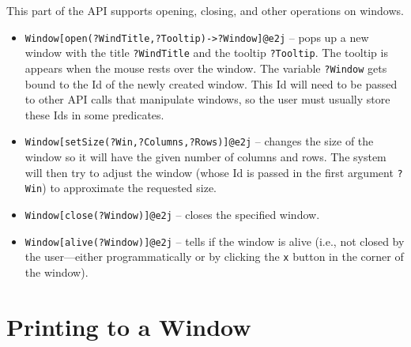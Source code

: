 This part of the API supports opening, closing, and other operations on windows.
\begin{itemize}
\item \texttt{Window[open(?WindTitle,?Tooltip)->?Window]@\bs{}e2j} -- pops up a new
  window with the title \texttt{?WindTitle} and the tooltip
  \texttt{?Tooltip}. The tooltip is appears when the mouse rests over the
  window. The variable \texttt{?Window} gets bound to the Id of the newly
  created window. This Id will need to be passed to other API calls that
  manipulate windows, so the user must usually store these Ids in some
  predicates.
\item \texttt{Window[setSize(?Win,?Columns,?Rows)]@\bs{}e2j} -- changes the size of
  the window so it will have the given number of columns and rows.
  The system will then try to adjust the window (whose Id is passed in the
  first argument \texttt{?Win}) to approximate the requested size.
\item \texttt{Window[close(?Window)]@\bs{}e2j} -- closes the specified window.
\item \texttt{Window[alive(?Window)]@\bs{}e2j} -- tells if the window is alive
  (i.e., not closed by the user---either programmatically or by clicking
  the \texttt{x} button in the corner of the window). 
\end{itemize}

\section{Printing to a Window}

